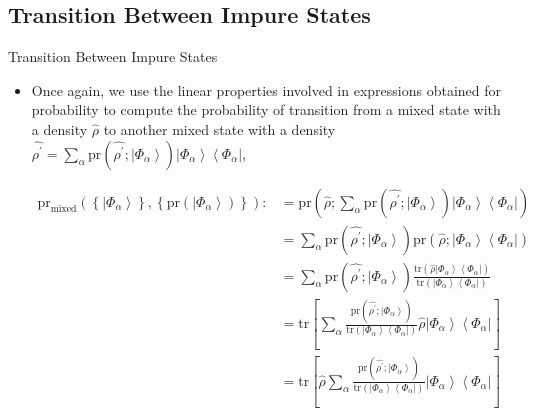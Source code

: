 \documentclass[9pt,handout]{beamer}
\newcommand{\pr}[0]{\text{pr}}
\newcommand{\tr}[0]{\text{tr}}
\begin{document}
\subsection{Transition Between Impure States}
\begin{frame}{Transition Between Impure States}
\begin{itemize}
\item Once again, we use the linear properties involved in expressions obtained for probability to compute the probability of transition from a mixed state with a density $\widehat{\rho}$ to another mixed state with a density $\displaystyle{\widehat{\rho^\prime} = \sum_\alpha \pr \left( \widehat{\rho^\prime}; \left\lvert \Phi_\alpha \right\rangle \right) \left\lvert \Phi_\alpha \right\rangle \left\langle \Phi_\alpha \right\rvert}$,

\begin{align*}
\pr_{\text{mixed}} \left( \left\{ \left\lvert \Phi_\alpha \right\rangle \right\}, \left\{ \pr \left( \left\lvert \Phi_\alpha \right\rangle \right) \right\} \right) : & = \pr \left( \widehat{\rho}; \sum_\alpha \pr \left( \widehat{\rho^\prime}; \left\lvert \Phi_\alpha \right\rangle \right) \left\lvert \Phi_\alpha \right\rangle \left\langle \Phi_\alpha \right\rvert \right) \\
& = \sum_\alpha \pr \left( \widehat{\rho^\prime}; \left\lvert \Phi_\alpha \right\rangle \right) \pr \left( \widehat{\rho}; \left\lvert \Phi_\alpha \right\rangle \left\langle \Phi_\alpha \right\rvert \right) \\
& = \sum_\alpha \pr \left( \widehat{\rho^\prime}; \left\lvert \Phi_\alpha \right\rangle \right) \frac{\tr \left( \widehat{\rho} \left\lvert \Phi_\alpha \right\rangle \left\langle \Phi_\alpha \right\rvert \right)}{\tr \left( \left\lvert \Phi_\alpha \right\rangle \left\langle \Phi_\alpha \right\rvert \right)} \\
& = \tr \left[ \sum_\alpha \frac{\pr \left( \widehat{\rho^\prime}; \left\lvert \Phi_\alpha \right\rangle \right)}{\tr \left( \left\lvert \Phi_\alpha \right\rangle \left\langle \Phi_\alpha \right\rvert \right)} \widehat{\rho} \left\lvert \Phi_\alpha \right\rangle \left\langle \Phi_\alpha \right\rvert \right] \\
& = \tr \left[ \widehat{\rho} \sum_\alpha \frac{\pr \left( \widehat{\rho^\prime}; \left\lvert \Phi_\alpha \right\rangle \right)}{\tr \left( \left\lvert \Phi_\alpha \right\rangle \left\langle \Phi_\alpha \right\rvert \right)} \left\lvert \Phi_\alpha \right\rangle \left\langle \Phi_\alpha \right\rvert \right]
\end{align*}
\end{itemize}
\end{frame}
\end{document}
